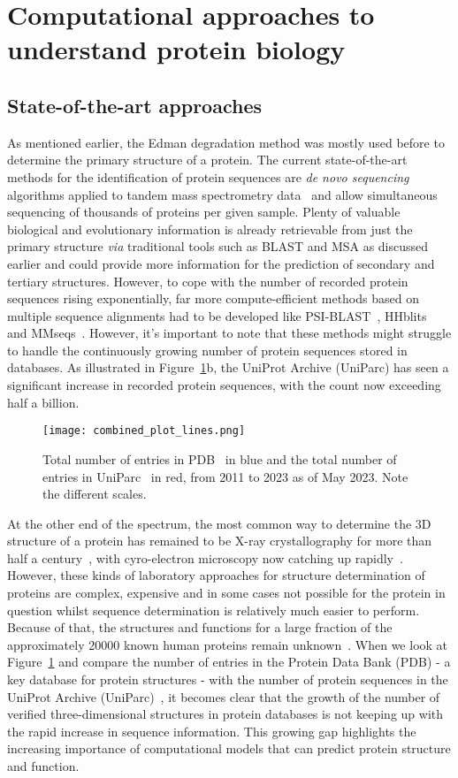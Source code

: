 \section{Computational approaches to understand protein biology}
\subsection*{State-of-the-art approaches}
As mentioned earlier, the Edman degradation method was mostly used before to determine the primary structure of a protein. The current state-of-the-art methods for the identification of protein sequences are \textit{de novo sequencing} algorithms applied to tandem mass spectrometry data~\cite{protseq} and allow simultaneous sequencing of thousands of proteins per given sample. Plenty of valuable biological and evolutionary information is already retrievable from just the primary structure \textit{via} traditional tools such as BLAST and MSA as discussed earlier and could provide more information for the prediction of secondary and tertiary structures. However, to cope with the number of recorded protein sequences rising exponentially, far more compute-efficient methods based on multiple sequence alignments had to be developed like PSI-BLAST~\cite{psiblast}, HHblits~\cite{hhblits3} and MMseqs~\cite{mmseqs2}. However, it's important to note that these methods might struggle to handle the continuously growing number of protein sequences stored in databases. As illustrated in Figure~\ref{fig:pdb}b, the UniProt Archive (UniParc) has seen a significant increase in recorded protein sequences, with the count now exceeding half a billion.

\begin{figure}[!ht]
    \centering
    \texttt{[image: combined\_plot\_lines.png]}
    \caption{Total number of entries in PDB~\cite{pdb} in blue and the total number of entries in UniParc~\cite{uniprot} in red, from 2011 to 2023 as of May 2023. Note the different scales.}
    \label{fig:pdb}
\end{figure}

At the other end of the spectrum, the most common way to determine the 3D structure of a protein has remained to be X-ray crystallography for more than half a century~\cite{xray}, with cyro-electron microscopy now catching up rapidly~\cite{cyroem}. However, these kinds of laboratory approaches for structure determination of proteins are complex, expensive and in some cases not possible for the protein in question whilst sequence determination is relatively much easier to perform. Because of that, the structures and functions for a large fraction of the approximately 20000 known human proteins remain unknown~\cite{coverage}. When we look at Figure~\ref{fig:pdb} and compare the number of entries in the Protein Data Bank (PDB)\cite{pdb} - a key database for protein structures - with the number of protein sequences in the UniProt Archive (UniParc)~\cite{uniprot}, it becomes clear that the growth of the number of verified three-dimensional structures in protein databases is not keeping up with the rapid increase in sequence information. This growing gap highlights the increasing importance of computational models that can predict protein structure and function.

